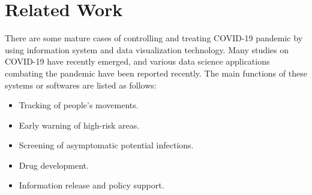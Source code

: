 \documentclass[sigplan,screen]{acmart}
\begin{document}
\begin{figure}[hptb]
\end{figure}

\section{Related Work}
There are some mature cases of controlling and treating COVID-19 pandemic by using information system and data visualization technology.
Many studies on COVID-19 have recently emerged, and various data science applications combating the pandemic have been reported recently\cite{latif2020leveraging}.
The main functions of these systems or softwares are listed as follows:\cite{jia2020big}
\begin{itemize}
	\item Tracking of people's movements.
	\item Early warning of high-risk areas.
	\item Screening of asymptomatic potential infections.
	\item Drug development.
	\item Information release and policy support.
\end{itemize}
\end{document}
